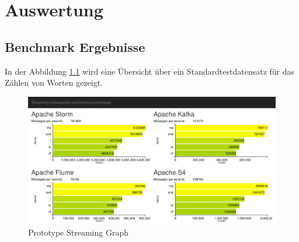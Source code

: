 \chapter{Auswertung}

\section{Benchmark Ergebnisse}

In der Abbildung \ref{fig:prototypeStreamingGraph} wird eine Übersicht über ein Standardtestdatensatz für das Zählen von Worten gezeigt.

\begin{figure}[htb!]
\centering
\includegraphics[width=1.0\textwidth]{bilder/PrototypeStreamingGraph.png}
\caption{Prototype Streaming Graph
\label{fig:prototypeStreamingGraph}}
\end{figure}


